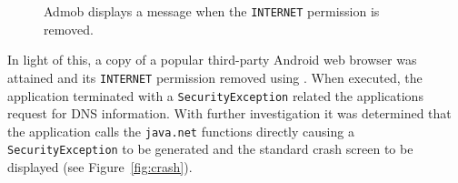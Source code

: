 \begin{figure}[t]
\centerline{}
\caption{Admob displays a message when the \texttt{INTERNET} permission is removed.}
\label{fig:removing}
\end{figure}

In light of this, a copy of a popular third-party Android web browser was attained and its \texttt{INTERNET} permission removed using \toolname. When executed, the application terminated with a \texttt{SecurityException} related the applications request for DNS information. With further investigation it was determined that the application calls the \texttt{java.net} functions directly causing a \texttt{SecurityException} to be generated and the standard crash screen to be displayed (see Figure~\ref{fig:crash}).

